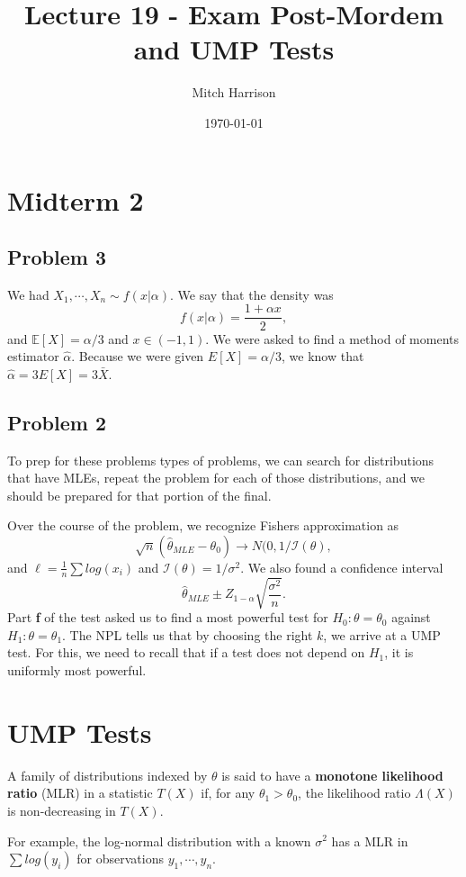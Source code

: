 \documentclass[titlepage, 12pt, leqno]{article}
\title{\Huge{Lecture 19 - Exam Post-Mordem and UMP Tests}}
\author{\large{Mitch Harrison}}
\date{\today}
\begin{document}
\setlength{\parskip}{1\baselineskip}
\setlength{\parindent}{15pt}
\maketitle
\tableofcontents
\newpage


\section{Midterm 2}

\subsection{Problem 3}
We had $X_{1}, \cdots , X_{n} \sim f(x|\alpha)$. We say that the density was
\[
f(x|\alpha) = \frac{1 +\alpha x}{2},
\]
and $\mathbb{E}[X] = \alpha/3$ and $x \in (-1,1)$. We were asked to find a
method of moments estimator $\hat \alpha$. Because we were given $E[X] = 
\alpha/3$, we know that $\hat \alpha = 3E[X] = 3\bar X$.

\subsection{Problem 2}
\begin{note}
    To prep for these problems types of problems, we can search for distributions
    that have MLEs, repeat the problem for each of those distributions, and we
    should be prepared for that portion of the final.
\end{note}

Over the course of the problem, we recognize Fishers approximation as
\[
\sqrt{n}(\hat \theta_{MLE} - \theta_{0}) \rightarrow N(0, 1/\mathcal{I}(
\theta),
\]
and $\ell = \frac{1}{n}\sum log(x_{i})$ and $\mathcal{I}(\theta) = 1/\sigma^{2}$.
We also found a confidence interval
\[
    \hat \theta_{MLE} \pm Z_{1-\alpha}\sqrt{\frac{\sigma^{2}}{n}}.
\]
Part \textbf{f} of the test asked us to find a most powerful test for
$H_{0}:\theta = \theta_{0}$ against $H_{1}:\theta = \theta_{1}$. The
NPL tells us that by choosing the right $k$, we arrive at a UMP test. For this,
we need to recall that if a test does not depend on $H_{1}$, it is uniformly
most powerful.

\pagebreak
\section{UMP Tests}
\begin{definition}
    A family of distributions indexed by $\theta$ is said to have a
    \textbf{monotone likelihood ratio} (MLR) in a statistic $T(X)$ if, for any
    $\theta_{1} > \theta_{0}$, the likelihood ratio $\Lambda(X)$ is 
    non-decreasing in $T(X)$.

    For example, the log-normal distribution with a known $\sigma^{2}$ has a MLR
    in $\sum log(y_{i})$ for observations $y_{1}, \cdots , y_{n}$.
\end{definition}
\end{document}
